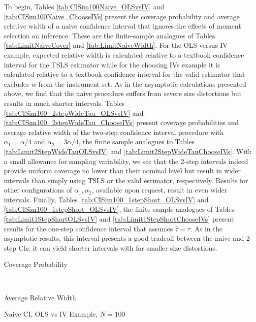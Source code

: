 To begin, Tables \ref{tab:CISim100Naive_OLSvsIV} and \ref{tab:CISim100Naive_ChooseIVs} present the coverage probability and average relative width of a naive confidence interval that ignores the effects of moment selection on inference.
These are the finite-sample analogues of Tables \ref{tab:LimitNaiveCover} and \ref{tab:LimitNaiveWidth}.
For the OLS versus IV example, expected relative width is calculated relative to a textbook confidence interval for the TSLS estimator while for the choosing IVs example it is calculated relative to a textbook confidence interval for the valid estimator that excludes $w$ from the instrument set. 
As in the asymptotic calculations presented above, we find that the naive procedure suffers from severe size distortions but results in much shorter intervals.
Tables \ref{tab:CISim100_2stepWideTau_OLSvsIV} and \ref{tab:CISim100_2stepWideTau_ChooseIVs} 
present coverage probabilities and average relative width of the two-step confidence interval procedure with $\alpha_1 = \alpha/4$ and $\alpha_2 = 3\alpha/4$, the finite sample analogues to Tables \ref{tab:Limit2StepWideTauOLSvsIV} and \ref{tab:Limit2StepWideTauChooseIVs}. 
With a small allowance for sampling variability, we see that the 2-step intervals indeed provide uniform coverage no lower than their nominal level but result in wider intervals than simply using TSLS or the valid estimator, respectively.
Results for other configurations of $\alpha_1, \alpha_2$, available upon request, result in even wider intervals.
Finally, Tables \ref{tab:CISim100_1stepShort_OLSvsIV} and \ref{tab:CISim100_1stepShort_OLSvsIV}, the finite-sample analogues of Tables \ref{tab:Limit1StepShortOLSvsIV} and \ref{tab:Limit1StepShortChooseIVs} present results for the one-step confidence interval that assumes $\widehat{\tau} = \tau$.
As in the asymptotic results, this interval presents a good tradeoff between the naive and 2-step CIs: it can yield shorter intervals with far smaller size distortions.

\begin{table}[h]
  \centering
  \begin{subtable}{0.48\textwidth}
    \caption{Coverage Probability}
    
  \end{subtable}
  ~
  \begin{subtable}{0.48\textwidth}
    \caption{Average Relative Width}
    
  \end{subtable}
  \caption{Naive CI, OLS vs IV Example, $N=100$}
  \label{tab:CISim100Naive_OLSvsIV}
\end{table}



